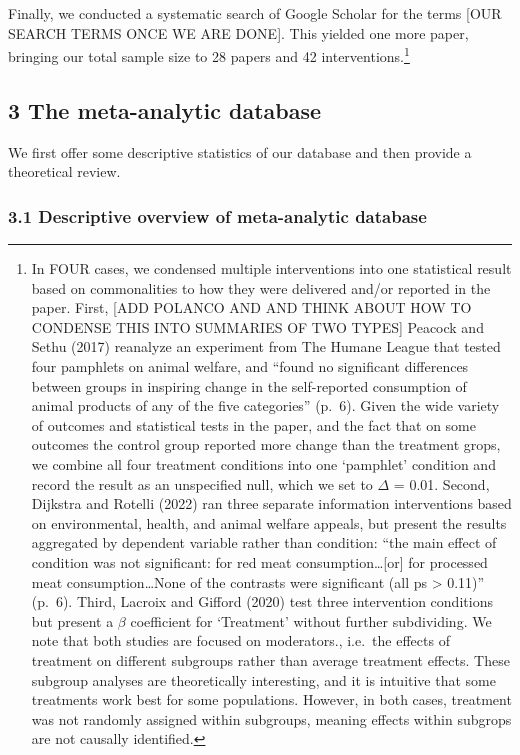 \documentclass[
  man]{apa6}
\begin{document}
Finally, we conducted a systematic search of Google Scholar for the terms {[}OUR SEARCH TERMS ONCE WE ARE DONE{]}. This yielded one more paper, bringing our total sample size to 28 papers and 42 interventions.\footnote{In FOUR cases, we condensed multiple interventions into one statistical result based on commonalities to how they were delivered and/or reported in the paper. First, {[}ADD POLANCO AND AND THINK ABOUT HOW TO CONDENSE THIS INTO SUMMARIES OF TWO TYPES{]} Peacock and Sethu (2017) reanalyze an experiment from The Humane League that tested four pamphlets on animal welfare, and ``found no significant differences between groups in inspiring change in the self-reported consumption of animal products of any of the five categories'' (p.~6). Given the wide variety of outcomes and statistical tests in the paper, and the fact that on some outcomes the control group reported more change than the treatment grops, we combine all four treatment conditions into one `pamphlet' condition and record the result as an unspecified null, which we set to \(\Delta\) = 0.01. Second, Dijkstra and Rotelli (2022) ran three separate information interventions based on environmental, health, and animal welfare appeals, but present the results aggregated by dependent variable rather than condition: ``the main effect of condition was not significant: for red meat consumption\ldots{[}or{]} for processed meat consumption\ldots None of the contrasts were significant (all ps \textgreater{} 0.11)'' (p.~6). Third, Lacroix and Gifford (2020) test three intervention conditions but present a \(\beta\) coefficient for `Treatment' without further subdividing. We note that both studies are focused on moderators., i.e.~the effects of treatment on different subgroups rather than average treatment effects. These subgroup analyses are theoretically interesting, and it is intuitive that some treatments work best for some populations. However, in both cases, treatment was not randomly assigned within subgroups, meaning effects within subgrops are not causally identified.}

\subsection{3 The meta-analytic database}\label{the-meta-analytic-database}

We first offer some descriptive statistics of our database and then provide a theoretical review.

\subsubsection{3.1 Descriptive overview of meta-analytic database}\label{descriptive-overview-of-meta-analytic-database}
\end{document}
